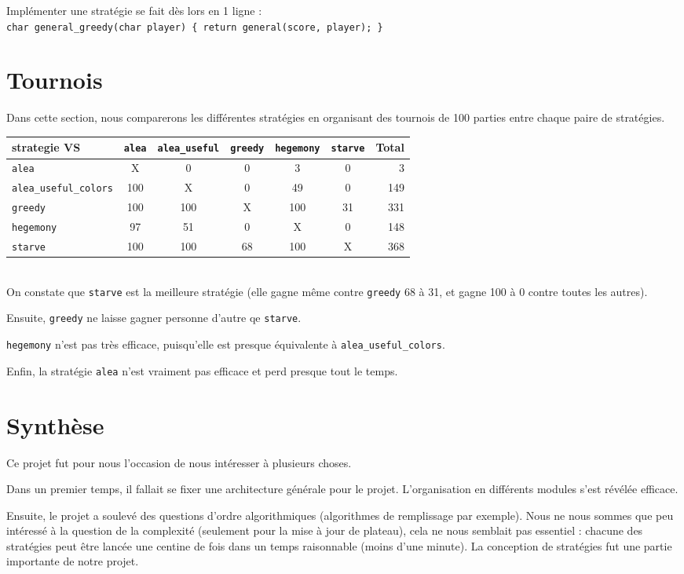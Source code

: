 \documentclass[12pt]{article}
\def\sec#1{\section{#1}}
\begin{document}
Implémenter une stratégie se fait dès lors en 1 ligne :\\
\texttt{char general\_greedy(char player) \{ return general(score, player); \}}


\sec{Tournois}
Dans cette section, nous comparerons les différentes stratégies en organisant des tournois de 100 parties entre chaque paire de stratégies.\\


\begin{tabular}{l|c|c|c|c|c|r}
strategie VS & \texttt{alea} & \texttt{alea\_useful} & \texttt{greedy} & \texttt{hegemony} & \texttt{starve} & Total\\
\hline
\texttt{alea} & X & 0 & 0 & 3 & 0 & 3\\
\hline
\texttt{alea\_useful\_colors} & 100 & X & 0 & 49 & 0 & 149\\
\hline
\texttt{greedy} & 100 & 100 & X & 100 & 31 & 331\\
\hline
\texttt{hegemony} & 97 & 51 & 0 & X & 0 & 148\\
\hline
\texttt{starve} & 100 & 100 & 68 & 100 & X & 368\\
\hline
\end{tabular}\\

On constate que \texttt{starve} est la meilleure stratégie (elle gagne même contre \texttt{greedy} 68 à 31, et gagne 100 à 0 contre toutes les autres).

Ensuite, \texttt{greedy} ne laisse gagner personne d'autre qe \texttt{starve}.

\texttt{hegemony} n'est pas très efficace, puisqu'elle est presque équivalente à \texttt{alea\_useful\_colors}.

Enfin, la stratégie \texttt{alea} n'est vraiment pas efficace et perd presque tout le temps. 

\sec{Synthèse}
Ce projet fut pour nous l'occasion de nous intéresser à plusieurs choses.

Dans un premier temps, il fallait se fixer une architecture générale pour le projet. L'organisation en différents modules s'est révélée efficace.

Ensuite, le projet a soulevé des questions d'ordre algorithmiques (algorithmes de remplissage par exemple). Nous ne nous sommes que peu intéressé à la question de la complexité (seulement pour la mise à jour de plateau), cela ne nous semblait pas essentiel : chacune des stratégies peut être lancée une centine de fois dans un temps raisonnable (moins d'une minute). La conception de stratégies fut une partie importante de notre projet.
\end{document}
